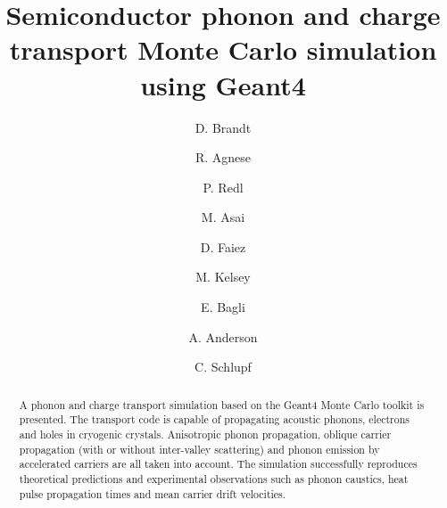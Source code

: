 \documentclass[preprint,12pt]{elsarticle}
\begin{document}
\begin{frontmatter}


\author{D. Brandt }
\author{R. Agnese }
\author{P. Redl }
\author{M. Asai }
\author{D. Faiez }
\author{M. Kelsey }
\author{E. Bagli }
\author{A. Anderson }
\author{C. Schlupf }



\title{Semiconductor phonon and charge transport Monte Carlo simulation using Geant4}


\author{}

\address{}

\begin{abstract}

A phonon and charge transport simulation based on the Geant4 Monte Carlo toolkit is presented. The transport code is capable of propagating acoustic phonons, electrons and holes in cryogenic crystals. Anisotropic phonon propagation, oblique carrier propagation (with or without inter-valley scattering) and phonon emission by accelerated carriers are all taken into account. The simulation successfully reproduces theoretical predictions and experimental observations such as phonon caustics, heat pulse propagation times and mean carrier drift velocities.


\end{abstract}
\end{frontmatter}
\end{document}

